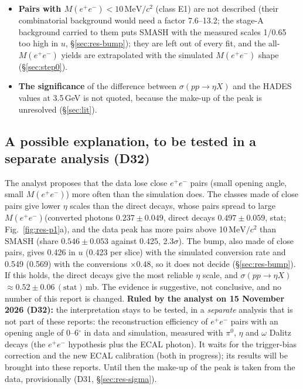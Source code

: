 \documentclass[11pt,a4paper]{article}
\newcommand{\piz}{\ensuremath{\pi^{0}}\xspace}
\newcommand{\ee}{\ensuremath{e^{+}e^{-}}\xspace}
\newcommand{\Mee}{\ensuremath{M(e^{+}e^{-})}\xspace}
\newcommand{\MeVcc}{\ensuremath{\mathrm{MeV}/c^{2}}\xspace}
\newcommand{\sigeta}{\ensuremath{\sigma(pp\to\eta X)}\xspace}
\begin{document}
\begin{itemize}
      the per-channel scales are a documented description, not measurements (D36; \S\ref{sec:res-flex}).
\item \textbf{Pairs with \Mee$<10$\,\MeVcc} (class E1) are not described (their combinatorial background would need a factor 7.6--13.2; the stage-A
      background carried to them puts SMASH with the measured scales 1/0.65 too high in $u$, \S\ref{sec:res-bump}); they are left out of every fit, and the all-\Mee yields are extrapolated with the simulated \Mee shape (\S\ref{sec:step0}).
\item \textbf{The significance} of the difference between \sigeta and the HADES values at 3.5\,GeV is not quoted, because the make-up of the
      peak is unresolved (\S\ref{sec:lit}).
\end{itemize}

\subsection{A possible explanation, to be tested in a separate analysis (D32)}
\label{sec:res-d32}
The analyst proposes that the data lose close \ee pairs (small opening angle, small \Mee) more often than the simulation does. The classes made
of close pairs give lower $\eta$ scales than the direct decays, whose pairs spread to large \Mee (converted photons $0.237\pm0.049$, direct
decays $0.497\pm0.059$, stat; Fig.~\ref{fig:res-p1}a), and the data peak has more pairs above 10\,\MeVcc than SMASH (share $0.546\pm0.053$ against 0.425, 2.3$\sigma$).
The bump, also made of close pairs, gives 0.426 in $u$ (0.423 per slice) with the simulated conversion rate and 0.549 (0.569) with the
conversions $\times0.48$, so it does not decide (\S\ref{sec:res-bump}). If this holds, the direct decays give the most reliable $\eta$ scale, and
\sigeta $\approx0.52\pm0.06\,(\mathrm{stat})$\,mb. The evidence is suggestive, not conclusive, and no number of this report is changed.
\textbf{Ruled by the analyst on 15 November 2026 (D32):} the interpretation stays to be tested, in a \emph{separate} analysis that is not part
of these reports: the reconstruction efficiency of \ee pairs with an opening angle of 0--6$^\circ$ in data and simulation, measured with \piz,
$\eta$ and $\omega$ Dalitz decays (the \ee hypothesis plus the ECAL photon). It waits for the trigger-bias correction and the new ECAL calibration
(both in progress); its results will be brought into these reports. Until then the make-up of the peak is taken from the data, provisionally
(D31, \S\ref{sec:res-sigma}).
\end{document}
